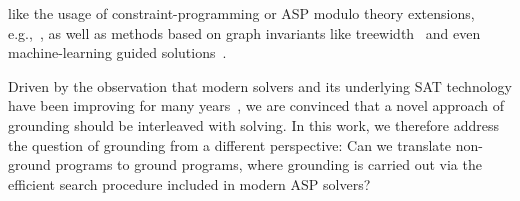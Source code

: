 \documentclass{article}
\begin{document}
like the usage of constraint-programming or ASP modulo theory extensions, e.g.,~\cite{BanbaraEtAl17,JanhunenEtAl17,CabalarEtAl20}, 
as well as methods based on graph invariants like treewidth~\cite{BichlerMorakWoltran20,CalimeriPerriZangari19,BliemEtAl20,Mitchell19}
and even machine-learning guided solutions~\cite{}. %
%
%

Driven by the observation that modern solvers and
its underlying SAT technology have been improving for many years~\cite{},
we are convinced that a novel approach of grounding should be  interleaved with solving. %
%
In this work, we therefore address the question of grounding from a  %
different perspective: Can we translate
non-ground programs to ground programs, where grounding is carried out via the efficient search procedure included in modern ASP solvers?
%
\end{document}
